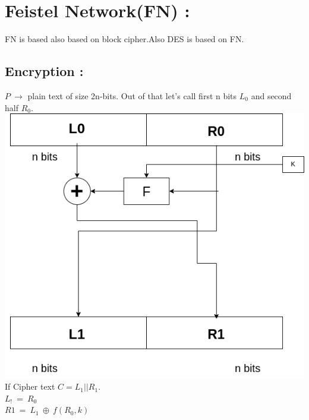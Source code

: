 \documentclass[11pt]{article}
\begin{document}
\section{Feistel Network(FN) :}
FN is based also based on block cipher.Also DES is based on FN.\\

\begin{multicols}{2}
\subsection{Encryption :}
$P\ \rightarrow $ plain text of size 2n-bits.
Out of that let's call first n bits $L_0$ and second half $R_0$.\\
\includegraphics[scale=0.3]{Images/L4/L4_Cryupto_FN.drawio.png}\\
If Cipher text $C=L_1||R_1$.\\
$L_!\ =\ R_0$\\
$R1\ =\ L_1\ \oplus\ f(R_0,k)$

\columnbreak

\end{multicols}
\end{document}
